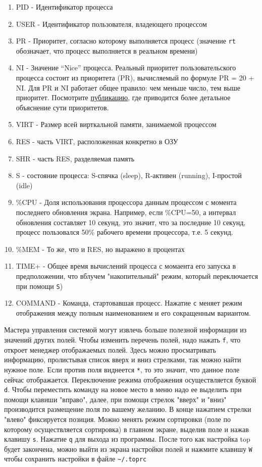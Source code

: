 \documentclass{report}
\begin{document}
\begin{enumerate}
\tightlist
\item
  PID - Идентификатор процесса
\item
  USER - Идентификатор пользователя, владеющего процессом
\item
  PR - Приоритет, согласно которому выполняется процесс (значение
  \texttt{rt} обозначает, что процесс выполняется в реальном времени)
\item
  NI - Значение ``Nice'' процесса. Реальный приоритет пользовательского
  процесса состоит из приоритета (PR), вычисляемый по формуле PR = 20 +
  NI. Для PR и NI работает общее правило: чем меньше число, тем выше
  приоритет. Посмотрите
  \href{https://askubuntu.com/a/656787/917201}{публикацию}, где
  приводится более детальное объяснение сути приоритетов.
\item
  VIRT - Размер всей вирткальной памяти, занимаемой процессом
\item
  RES - часть VIRT, расположенная конкретно в ОЗУ
\item
  SHR - часть RES, разделяемая память
\item
  S - состояние процесса: S-спячка (sleep), R-активен (running),
  I-простой (idle)
\item
  \%CPU - Доля использования процессора данным процессом с момента
  последнего обновления экрана. Например, если \%CPU=50, а интервал
  обновления составляет 10 секунд, это значит, что за последние 10
  секунд, процесс пользовался 50\% рабочего времени процессора, т.е. 5
  секунд.
\item
  \%MEM - То же, что и RES, но выражено в процентах
\item
  TIME+ - Общее время вычислений процесса с момаента его запуска в
  предположении, что вблучем "накопительный" режим, который
  переключается при помощи \texttt{S})
\item
  COMMAND - Команда, стартовавшая процесс. Нажатие \texttt{c} меняет
  режим отображения между полным наименованием и его сокращенным
  вариантом.
\end{enumerate}

Мастера управления системой могут извлечь больше полезной информации из
значений других полей. Чтобы изменить перечень полей, надо нажать
\texttt{f}, что откроет менеджер отображаемых полей. Здесь можно
просматривать информацию, пролистывая список вверх и вниз стрелками, так
можно найти нужное поле. Если против поля виднеется \texttt{*}, то это
значит, что данное поле сейчас отображается. Переключение режима
отображения осуществляется буквой \texttt{d}. Чтобы переместить команду
на новое место в меню надо ее выделить при помощи клавиши "вправо",
далее, при помощи стрелок "вверх" и "вниз" производится размещение поля
по вашему желанию. В конце нажатием стрелки "влево" фиксируется позиция.
Можно менять режим сортировки (поле по которому осуществляется
сортировка) в главном экране, выделив поле и нажав клавишу \texttt{s}.
Нажатие \texttt{q} для выхода из программы. После того как настройка top
будет закончена, можно выйти из экрана настройки полей и нажмите клавишу
\texttt{W} чтобы сохранить настройки в файле
\texttt{\textasciitilde{}/.toprc}
\end{document}
